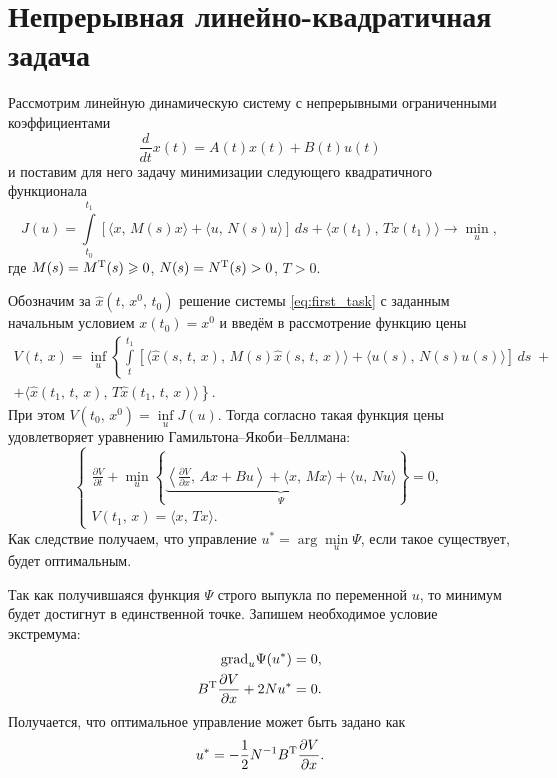 \section{Непрерывная линейно-квадратичная задача}

Рассмотрим линейную динамическую систему с непрерывными ограниченными коэффициентами
\begin{equation}\label{eq:first_task}
        \frac{d}{dt}x(t) = A(t)x(t) + B(t)u(t)
\end{equation}
и поставим для него задачу минимизации следующего квадратичного функционала
\begin{equation}\label{eq:functional}
        J(u)
=
        \int\limits_{t_0}^{t_1}
[
\langle
x,\,M(s)x
\rangle
+
\langle
u,\,N(s)u
\rangle
]\,ds
        +
        \langle
        x(t_1),\,Tx(t_1)
        \rangle
\to
        \min\limits_{u},
\end{equation}
где $M(s) = M^\mathrm{T}(s) \geqslant 0$,
$N(s) = N^\mathrm{T}(s) > 0$,
$T > 0$.

Обозначим за $\hat x(t,\,x^0,\,t_0)$ решение системы \eqref{eq:first_task} с заданным начальным условием $x(t_0) = x^0$ и введём в рассмотрение функцию цены
\begin{multline*}
        V(t,\,x)
=
\inf\limits_u \left\{
        \int\limits_{t}^{t_1}
[
\langle
\hat x(s,\,t,\,x),\,M(s)\hat x(s,\,t,\,x)
\rangle
+
\langle
u(s),\,N(s)u(s)
\rangle
]\,ds
        \;+\right.\\+\left.
        \langle
        \hat x(t_1,\,t,\,x),\,T\hat x(t_1,\,t,\,x)
        \rangle
\right\}.
\end{multline*}
При этом $V(t_0,\,x^0) = \inf\limits_u J(u)$. Тогда согласно \cite{krasovsky} такая функция цены удовлетворяет уравнению Гамильтона--Якоби--Беллмана:
\begin{equation}\label{eq:g-ya-b}
\begin{cases}
        \frac{\partial V}{\partial t}
        +
        \min\limits_{u}
        \left\{
        \underbrace{
\left\langle
\frac{\partial V}{\partial x}
,\,
Ax + Bu
\right\rangle
+
\langle
x,\,Mx
\rangle
+
\langle
u,\,Nu
\rangle
        }\limits_{\Psi}
        \right\}
        =
        0,
\\
        V(t_1,\,x)
        =
        \langle x,\,Tx \rangle.
\end{cases}
\end{equation}
Как следствие получаем, что управление $u^* = \arg\min\limits_u \Psi$, если такое существует, будет оптимальным.

Так как получившаяся функция $\Psi$ строго выпукла по переменной $u$, то минимум будет достигнут в единственной точке. Запишем необходимое условие экстремума:
\begin{align*}
\mathrm{grad}_u \Psi(u^*) &= 0,\\
B^\mathrm{T}\frac{\partial V}{\partial x} + 2Nu^* &=0. 
\end{align*}
Получается, что оптимальное управление может быть задано как
\begin{equation}
        u^* = -\frac{1}{2}N^{-1}B^\mathrm{T}\frac{\partial V}{\partial x}.
\end{equation}

